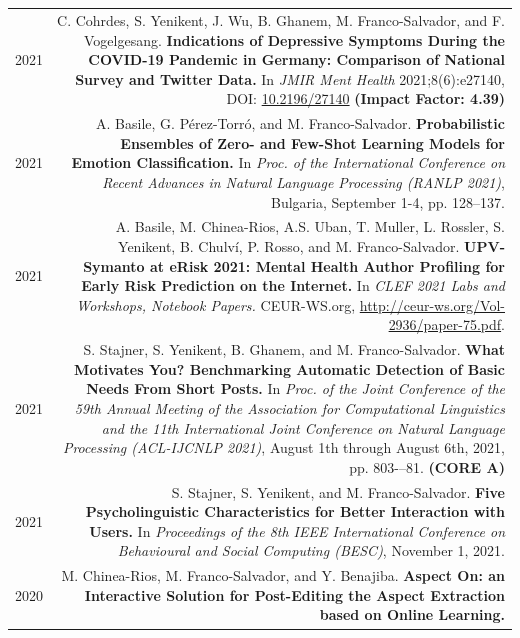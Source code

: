 \documentclass[10pt]{article}
\begin{document}
\section*{}
\begin{tabular}{L!{\VRule}R}
    2021 & C. Cohrdes, S. Yenikent, J. Wu, B. Ghanem, M. Franco-Salvador, and F. Vogelgesang. \textbf{Indications of Depressive Symptoms During the COVID-19 Pandemic in Germany: Comparison of National Survey and Twitter Data.}
	In \emph{JMIR Ment Health} 2021;8(6):e27140, DOI: \href{https://doi.org/10.2196/27140}{10.2196/27140} \textbf{(Impact Factor: 4.39)} \vspace{5pt}\\
	2021 & A. Basile, G. P{\'e}rez-Torr{\'o}, and M. Franco-Salvador. \textbf{Probabilistic Ensembles of Zero- and Few-Shot Learning Models for Emotion Classification.}
	In \emph{Proc. of the International Conference on Recent Advances in Natural Language Processing (RANLP 2021)}, Bulgaria, September 1-4, pp. 128--137. \vspace{5pt}\\
	2021 & A. Basile, M. Chinea-Rios, A.S. Uban, T. Muller, L. Rossler, S. Yenikent, B. Chulv{\'i}, P. Rosso, and M. Franco-Salvador. \textbf{UPV-Symanto at eRisk 2021: Mental Health Author Profiling for Early Risk Prediction on the Internet.}
	In \emph{CLEF 2021 Labs and Workshops, Notebook Papers.} CEUR-WS.org, \href{http://ceur-ws.org/Vol-2936/paper-75.pdf}{http://ceur-ws.org/Vol-2936/paper-75.pdf}. \vspace{5pt}\\
	2021 & S. Stajner, S. Yenikent, B. Ghanem, and M. Franco-Salvador. \textbf{What Motivates You? Benchmarking Automatic Detection of Basic Needs From Short Posts.}
	In \emph{Proc. of the Joint Conference of the 59th Annual Meeting of the Association for Computational Linguistics and the 11th International Joint Conference on Natural Language Processing (ACL-IJCNLP 2021)}, August 1th through August 6th, 2021, pp.  803-–81. \textbf{(CORE A)}\vspace{5pt}\\
	2021 & S. Stajner, S. Yenikent, and M. Franco-Salvador. \textbf{Five Psycholinguistic Characteristics for Better Interaction with Users.}
	In \emph{Proceedings of the 8th IEEE International Conference on Behavioural and Social Computing (BESC)}, November 1, 2021.\vspace{5pt}\\
	2020 & M. Chinea-Rios, M. Franco-Salvador, and Y. Benajiba. \textbf{Aspect On: an Interactive Solution for Post-Editing the Aspect Extraction based on Online Learning.}

\end{tabular}
\end{document}
